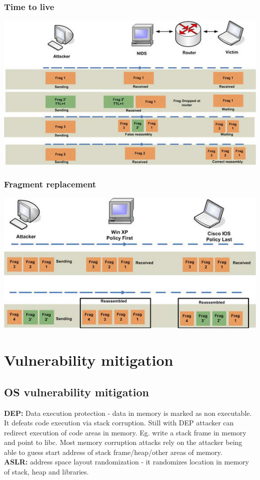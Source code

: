 \documentclass[10pt,a4paper]{book}
\begin{document}
\subsection{Time to live}
\includegraphics{IDS-evasion/3.jpg}
\subsection{Fragment replacement}
\includegraphics{IDS-evasion/4.jpg}
\chapter{Vulnerability mitigation}
\section{OS vulnerability mitigation}
\textbf{DEP:} Data execution protection - data in memory is marked as non executable. It defeats code execution via stack corruption. Still with DEP attacker can redirect execution of code areas in memory. Eg. write a stack frame in memory and point to libc. Most memory corruption attacks rely on the attacker being able to guess start address of stack frame/heap/other areas of memory.\\
\textbf{ASLR:} address space layout randomization - it randomizes location in memory of stack, heap and libraries.
\end{document}
